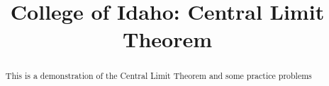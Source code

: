 \documentclass{xourse}
\title{College of Idaho: Central Limit Theorem}%
\begin{document}
      
\begin{abstract} %
This is a demonstration of the Central Limit Theorem and some practice problems
\end{abstract}
      
\maketitle
      

      
\end{document}
